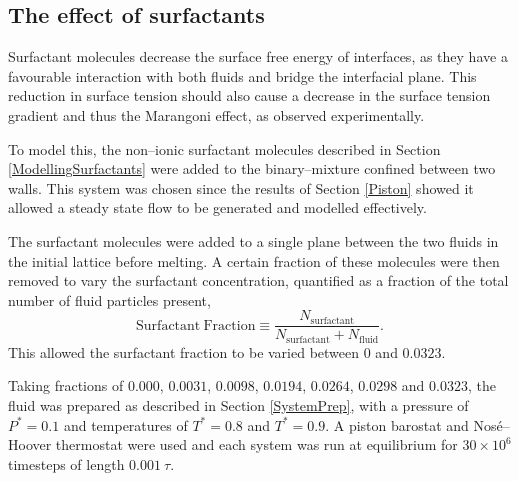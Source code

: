 \subsection{The effect of surfactants}\label{SurfResult}
Surfactant molecules decrease the surface free energy of interfaces, as they have a favourable interaction with both fluids and bridge the interfacial plane.
This reduction in surface tension should also cause a decrease in the surface tension gradient and thus the Marangoni effect, as observed experimentally.\cite{KimSubramanianA,KimSubramanianB,BartonSubramanian,ChenStebe}

To model this, the non--ionic surfactant molecules described in Section \ref{ModellingSurfactants} were added to the binary--mixture confined between two walls.
This system was chosen since the results of Section \ref{Piston} showed it allowed a steady state flow to be generated and modelled effectively.

The surfactant molecules were added to a single plane between the two fluids in the initial lattice before melting.
A certain fraction of these molecules were then removed to vary the surfactant concentration, quantified as a fraction of the total number of fluid particles present,
\begin{equation}
\mathrm{Surfactant\ Fraction} \equiv \frac{N_{\mathrm{surfactant}}}{N_{\mathrm{surfactant}}+N_{\mathrm{fluid}}}.
\end{equation}
This allowed the surfactant fraction to be varied between $0$ and $0.0323$.

Taking fractions of $0.000$, $0.0031$, $0.0098$, $0.0194$, $0.0264$, $0.0298$ and $0.0323$, the fluid was prepared as described in Section \ref{SystemPrep}, with a pressure of $P^{*}=0.1$ and temperatures of $T^{*}=0.8$ and $T^{*}=0.9$.
A piston barostat and Nos\'{e}--Hoover thermostat were used and each system was run at equilibrium for $30 \times 10^{6}$ timesteps of length $0.001\ \tau$.


